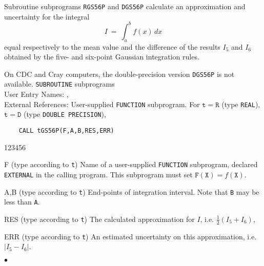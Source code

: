                                 
                          
\Submitter{}                               
Subroutine subprograms {\tt RGS56P} and {\tt DGS56P} calculate an
approximation and uncertainty for the integral
$$I \ = \ \int_a^b f(x)\,dx$$
equal respectively to the mean value and the difference of the
results $I_5$ and $I_6$ obtained by the five- and six-point
Gaussian integration rules.
\par
On CDC and Cray computers, the double-precision version {\tt DGS56P}
is not available.
\Structure
{\tt SUBROUTINE} subprograms \\
User Entry Names: ,  \\
External References: User-supplied {\tt FUNCTION} subprogram.
\Usage
For $\mathtt{t=R}$ (type {\tt REAL}), $\mathtt{t=D}$ (type
{\tt DOUBLE PRECISION}),
\begin{verbatim}
    CALL tGS56P(F,A,B,RES,ERR)
\end{verbatim}
\begin{DLtt}{123456}
\item[F] (type according to {\tt t}) Name of a user-supplied
{\tt FUNCTION} subprogram, declared {\tt EXTERNAL} in the calling
program. This subprogram must set $\mathtt{F(X)} = f(\mathtt{X})$.
\item[A,B] (type according to {\tt t}) End-points of integration
interval. Note that {\tt B} may be less than {\tt A}.
\item[RES] (type according to {\tt t}) The calculated approximation
for $I$, i.e. $\frac{1}{2}(I_5+I_6)$,
\item[ERR] (type according to {\tt t}) An estimated uncertainty
on this approximation, i.e. $|I_5-I_6|$.
\end{DLtt}
$\bullet$
